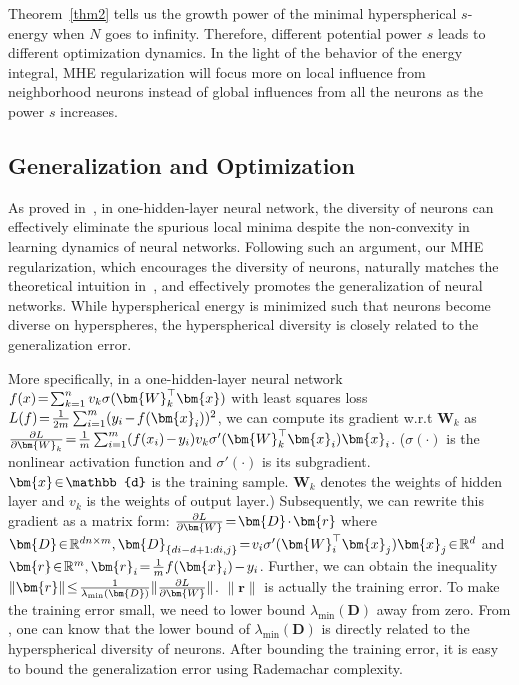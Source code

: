 \par
Theorem~\ref{thm2} tells us the growth power of the minimal hyperspherical $s$-energy when $N$ goes to infinity. Therefore, different potential power $s$ leads to different optimization dynamics. In the light of the behavior of the energy integral, MHE regularization will focus more on local influence from neighborhood neurons instead of global influences from all the neurons as the power $s$ increases.

\subsection{Generalization and Optimization}

As proved in~\cite{xie2016diverse}, in one-hidden-layer neural network, the diversity of neurons can effectively eliminate the spurious local minima despite the non-convexity in learning dynamics of neural networks. Following such an argument, our MHE regularization, which encourages the diversity of neurons, naturally matches the theoretical intuition in~\cite{xie2016diverse}, and  effectively promotes the generalization of neural networks. While hyperspherical energy is minimized such that neurons become diverse on hyperspheres, the hyperspherical diversity is closely related to the generalization error.
\par

More specifically, in a one-hidden-layer neural network $\thickmuskip=2mu \medmuskip=2mu f(x)=\sum_{k=1}^{n}v_k\sigma(\bm{W}_k^\top \bm{x})$ with least squares loss $\thickmuskip=2mu \medmuskip=2mu L(f)=\frac{1}{2m}\sum_{i=1}^m(y_i-f(\bm{x}_i))^2$, we can compute its gradient w.r.t $\bm{W}_k$ as  $\thickmuskip=2mu \medmuskip=2mu \frac{\partial L}{\partial \bm{W}_k}=\frac{1}{m}\sum_{i=1}^m(f(x_i)-y_i)v_k\sigma'(\bm{W}_k^\top \bm{x}_i)\bm{x}_i$. ($\sigma(\cdot)$ is the nonlinear activation function and $\sigma'(\cdot)$ is its subgradient. $\thickmuskip=2mu \medmuskip=2mu \bm{x}\in\mathbb{d}$ is the training sample. $\bm{W}_k$ denotes the weights of hidden layer and $v_k$ is the weights of output layer.) Subsequently, we can rewrite this gradient as a matrix form: $\thickmuskip=2mu \medmuskip=2mu \frac{\partial L}{\partial \bm{W}}=\bm{D}\cdot \bm{r}$ where $\thickmuskip=2mu \medmuskip=2mu \bm{D}\in\mathbb{R}^{dn\times m}, \bm{D}_{\{di-d+1:di,j\}}=v_i\sigma'(\bm{W}_i^\top\bm{x}_j)\bm{x}_j\in\mathbb{R}^d$ and $\thickmuskip=2mu \medmuskip=2mu \bm{r}\in\mathbb{R}^{m},\bm{r}_i=\frac{1}{m}f(\bm{x}_i)-y_i$. Further, we can obtain the inequality $\thickmuskip=2mu \medmuskip=2mu\|\bm{r}\|\leq\frac{1}{\lambda_{\min}(\bm{D})}\|\frac{\partial L}{\partial\bm{W}}\|$. $\|\bm{r}\|$ is actually the training error. To make the training error small, we need to lower bound $\lambda_{\min}(\bm{D})$ away from zero. From \cite{xie2016diverse,bilyk2017one}, one can know that the lower bound of $\lambda_{\min}(\bm{D})$ is directly related to the hyperspherical diversity of neurons. After bounding the training error, it is easy to bound the generalization error using Rademachar complexity.

